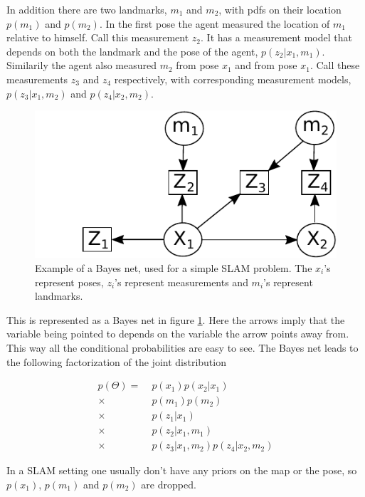 In addition there are two landmarks, $m_1$ and $m_2$, with pdfs on their location $p(m_1)$ and $p(m_2)$. In the first pose the agent measured the location of $m_1$ relative to himself. Call this measurement $z_2$. It has a measurement model that depends on both the landmark and the pose of the agent, $p(z_2|x_1,m_1)$. Similarily the agent also measured $m_2$ from pose $x_1$ and from pose $x_1$. Call these measurements $z_3$ and $z_4$ respectively, with corresponding measurement models, $p(z_3|x_1,m_2)$ and $p(z_4|x_2,m_2)$. 

\begin{figure}
    \centering
    \includegraphics[width=0.8\linewidth]{0_Images/3_Background/BayesNet.pdf}
    \caption[Example of a Bayes net.]
    {Example of a Bayes net, used for a simple SLAM problem. The $x_i$'s represent poses, $z_i$'s represent measurements and $m_i$'s represent landmarks.}
    \label{Fig:BayesNet}
\end{figure}

This is represented as a Bayes net in figure \ref{Fig:BayesNet}. Here the arrows imply that the variable being pointed to depends on the variable the arrow points away from. This way all the conditional probabilities are easy to see. The Bayes net leads to the following factorization of the joint distribution

\begin{align}
    p(\Theta) = \; & p(x_1)p(x_2|x_1) \\
    \times \; &p(m_1)p(m_2) \nonumber \\
    \times \; &p(z_1|x_1) \nonumber \\
    \times \; &p(z_2|x_1,m_1) \nonumber \\ 
    \times \; &p(z_3|x_1,m_2)p(z_4|x_2,m_2) \nonumber 
\end{align}

In a SLAM setting one usually don't have any priors on the map or the pose, so $p(x_1)$, $p(m_1)$ and $p(m_2)$ are dropped. 

